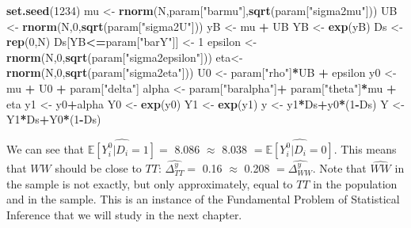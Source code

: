 \documentclass[]{book}
\newenvironment{Shaded}{\begin{snugshade}}{\end{snugshade}}
\newcommand{\DecValTok}[1]{\textcolor[rgb]{0.00,0.00,0.81}{#1}}
\newcommand{\KeywordTok}[1]{\textcolor[rgb]{0.13,0.29,0.53}{\textbf{#1}}}
\newcommand{\NormalTok}[1]{#1}
\newcommand{\OperatorTok}[1]{\textcolor[rgb]{0.81,0.36,0.00}{\textbf{#1}}}
\newcommand{\StringTok}[1]{\textcolor[rgb]{0.31,0.60,0.02}{#1}}
\newcommand{\esp}[1]{\mathbb{E}[ #1 ]}
\theoremstyle{definition}
\theoremstyle{definition}
\theoremstyle{definition}
\theoremstyle{remark}
\begin{document}
\begin{Shaded}
\begin{Highlighting}[]
\KeywordTok{set.seed}\NormalTok{(}\DecValTok{1234}\NormalTok{)}
\NormalTok{mu <-}\StringTok{ }\KeywordTok{rnorm}\NormalTok{(N,param[}\StringTok{"barmu"}\NormalTok{],}\KeywordTok{sqrt}\NormalTok{(param[}\StringTok{"sigma2mu"}\NormalTok{]))}
\NormalTok{UB <-}\StringTok{ }\KeywordTok{rnorm}\NormalTok{(N,}\DecValTok{0}\NormalTok{,}\KeywordTok{sqrt}\NormalTok{(param[}\StringTok{"sigma2U"}\NormalTok{]))}
\NormalTok{yB <-}\StringTok{ }\NormalTok{mu }\OperatorTok{+}\StringTok{ }\NormalTok{UB }
\NormalTok{YB <-}\StringTok{ }\KeywordTok{exp}\NormalTok{(yB)}
\NormalTok{Ds <-}\StringTok{ }\KeywordTok{rep}\NormalTok{(}\DecValTok{0}\NormalTok{,N)}
\NormalTok{Ds[YB}\OperatorTok{<=}\NormalTok{param[}\StringTok{"barY"}\NormalTok{]] <-}\StringTok{ }\DecValTok{1} 
\NormalTok{epsilon <-}\StringTok{ }\KeywordTok{rnorm}\NormalTok{(N,}\DecValTok{0}\NormalTok{,}\KeywordTok{sqrt}\NormalTok{(param[}\StringTok{"sigma2epsilon"}\NormalTok{]))}
\NormalTok{eta<-}\StringTok{ }\KeywordTok{rnorm}\NormalTok{(N,}\DecValTok{0}\NormalTok{,}\KeywordTok{sqrt}\NormalTok{(param[}\StringTok{"sigma2eta"}\NormalTok{]))}
\NormalTok{U0 <-}\StringTok{ }\NormalTok{param[}\StringTok{"rho"}\NormalTok{]}\OperatorTok{*}\NormalTok{UB }\OperatorTok{+}\StringTok{ }\NormalTok{epsilon}
\NormalTok{y0 <-}\StringTok{ }\NormalTok{mu }\OperatorTok{+}\StringTok{  }\NormalTok{U0 }\OperatorTok{+}\StringTok{ }\NormalTok{param[}\StringTok{"delta"}\NormalTok{]}
\NormalTok{alpha <-}\StringTok{ }\NormalTok{param[}\StringTok{"baralpha"}\NormalTok{]}\OperatorTok{+}\StringTok{  }\NormalTok{param[}\StringTok{"theta"}\NormalTok{]}\OperatorTok{*}\NormalTok{mu }\OperatorTok{+}\StringTok{ }\NormalTok{eta}
\NormalTok{y1 <-}\StringTok{ }\NormalTok{y0}\OperatorTok{+}\NormalTok{alpha}
\NormalTok{Y0 <-}\StringTok{ }\KeywordTok{exp}\NormalTok{(y0)}
\NormalTok{Y1 <-}\StringTok{ }\KeywordTok{exp}\NormalTok{(y1)}
\NormalTok{y <-}\StringTok{ }\NormalTok{y1}\OperatorTok{*}\NormalTok{Ds}\OperatorTok{+}\NormalTok{y0}\OperatorTok{*}\NormalTok{(}\DecValTok{1}\OperatorTok{-}\NormalTok{Ds)}
\NormalTok{Y <-}\StringTok{ }\NormalTok{Y1}\OperatorTok{*}\NormalTok{Ds}\OperatorTok{+}\NormalTok{Y0}\OperatorTok{*}\NormalTok{(}\DecValTok{1}\OperatorTok{-}\NormalTok{Ds)}
\end{Highlighting}
\end{Shaded}

We can see that \(\hat{\esp{Y_i^0|D_i=1}}=\) 8.086 \(\approx\) 8.038 \(=\hat{\esp{Y_i^0|D_i=0}}\).
This means that \(WW\) should be close to \(TT\): \(\hat{\Delta^y_{TT}}=\) 0.16 \(\approx\) 0.208 \(=\hat{\Delta^y_{WW}}\).
Note that \(\hat{WW}\) in the sample is not exactly, but only approximately, equal to \(TT\) in the population and in the sample.
This is an instance of the Fundamental Problem of Statistical Inference that we will study in the next chapter.
\end{document}
